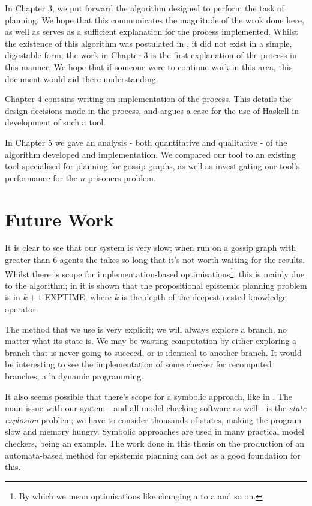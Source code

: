 \documentclass[10pt, a4paper]{report}
\begin{document}
In Chapter 3, we put forward the algorithm designed to perform the task of
planning. We hope that this communicates the magnitude of the wrok done here, as
well as serves as a sufficient explanation for the process implemented. Whilst
the existence of this algorithm was postulated in \cite{AutomataTechniques}, it
did not exist in a simple, digestable form; the work in Chapter 3 is the first
explanation of the process in this manner. We hope that if someone were to
continue work in this area, this document would aid there understanding. 

Chapter 4 contains writing on implementation of the process. This details the
design decisions made in the process, and argues a case for the use of Haskell
in development of such a tool. 

In Chapter 5 we gave an analysis - both quantitative and qualitative - of the
algorithm developed and implementation. We compared our tool to an existing tool
specialised for planning for gossip graphs, as well as investigating our tool's
performance for the $n$ prisoners problem. 

\section{Future Work}

It is clear to see that our system is very slow; when run on a gossip graph with
greater than 6 agents the takes so long that it's not worth waiting for the
results. Whilst there is scope for implementation-based
optimisations\footnote{By which we mean optimisations like changing a
   to a  and so on.}, this is mainly due to the
algorithm; in \cite{AutomataTechniques} it is shown that the propositional
epistemic planning problem is in \textsf{$k + 1$-EXPTIME}, where $k$ is the
depth of the deepest-nested knowledge operator. 

The method that we use is very explicit; we will always explore a branch, no
matter what its state is. We may be wasting computation by either exploring a
branch that is never going to succeed, or is identical to another branch. It
would be interesting to see the implementation of some checker for recomputed
branches, a la dynamic programming.

It also seems possible that there's scope for a symbolic approach, like in
\cite{MalvinThesis}. The main issue with our system - and all model checking
software as well - is the \emph{state explosion} problem; we have to consider
thousands of states, making the program slow and memory hungry. Symbolic
approaches are used in many practical model checkers, \cite{SMCDEL} being an
example. The work done in this thesis on the production of an automata-based
method for epistemic planning can act as a good foundation for this. 
\end{document}
